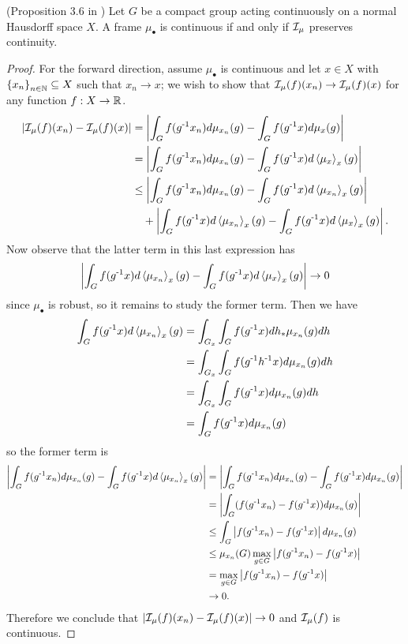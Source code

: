 \begin{theorem}\label{thm:frame-cont-iff-preserves-cont}
    (Proposition 3.6 in \cite{dym2024equivariant})
    Let $G$ be a compact group acting continuously on a normal Hausdorff space $X$.
    A frame $\mu_\bullet$ is continuous if and only if $\mathcal{I}_\mu$ preserves continuity.
    \begin{proof}
        For the forward direction, assume $\mu_\bullet$ is continuous and let $x \in X$ with $\left\{ x_n \right\}_{n \in \mathbb{N}} \subseteq X$ such that $x_n \to x$; we wish to show that $\mathcal{I}_\mu (f) (x_n) \to \mathcal{I}_\mu (f) (x)$ for any function $f : X \to \mathbb{R}$.
        \begin{align*}
            \left| \mathcal{I}_\mu (f) (x_n) - \mathcal{I}_\mu (f) (x) \right|
            &= \left| \int_G f(g^{\text{-}1} x_n) d\mu_{x_n} (g) - \int_G f(g^{\text{-}1} x) d\mu_{x} (g) \right| \\
            &= \left| \int_G f(g^{\text{-}1} x_n) d\mu_{x_n} (g) - \int_G f(g^{\text{-}1} x) d\left\langle \mu_{x} \right\rangle_x (g) \right| \\
            &\leq \left| \int_G f(g^{\text{-}1} x_n) d\mu_{x_n} (g) - \int_G f(g^{\text{-}1} x) d\left\langle \mu_{x_n} \right\rangle_x (g) \right| \\
            &\quad + \left| \int_G f(g^{\text{-}1} x) d\left\langle \mu_{x_n} \right\rangle_x (g) - \int_G f(g^{\text{-}1} x) d\left\langle \mu_{x} \right\rangle_x (g) \right|.
        \end{align*}
        Now observe that the latter term in this last expression has
        \[
            \left| \int_G f(g^{\text{-}1} x) d\left\langle \mu_{x_n} \right\rangle_x (g) - \int_G f(g^{\text{-}1} x) d\left\langle \mu_{x} \right\rangle_x (g) \right| \to 0
        \]
        since $\mu_\bullet$ is robust, so it remains to study the former term.
        Then we have
        \begin{align*}
            \int_G f(g^{\text{-}1} x) d\left\langle \mu_{x_n} \right\rangle_x (g)
            &= \int_{G_x} \int_G f(g^{\text{-}1} x) d h_* \mu_{x_n} (g) dh \\
            &= \int_{G_x} \int_G f(g^{\text{-}1} h^{\text{-}1} x) d \mu_{x_n} (g) dh \\
            &= \int_{G_x} \int_G f(g^{\text{-}1} x) d\mu_{x_n} (g) dh \\
            &= \int_G f(g^{\text{-}1} x) d\mu_{x_n} (g)
        \end{align*}
        so the former term is
        \begin{align*}
            \left| \int_G f(g^{\text{-}1} x_n) d\mu_{x_n} (g) - \int_G f(g^{\text{-}1} x) d\left\langle \mu_{x_n} \right\rangle_x (g) \right|
            &= \left| \int_G f(g^{\text{-}1} x_n) d\mu_{x_n} (g) - \int_G f(g^{\text{-}1} x) d\mu_{x_n} (g) \right| \\
            &= \left| \int_G (f(g^{\text{-}1} x_n)  - f(g^{\text{-}1} x)) d\mu_{x_n} (g) \right| \\
            &\leq \int_G \left| f(g^{\text{-}1} x_n)  - f(g^{\text{-}1} x) \right| d\mu_{x_n} (g) \\
            &\leq \mu_{x_n}(G) \max_{g \in G} \left| f(g^{\text{-}1} x_n) - f(g^{\text{-}1} x) \right| \\
            &= \max_{g \in G} \left| f(g^{\text{-}1} x_n) - f(g^{\text{-}1} x) \right| \\
            &\to 0.
        \end{align*}
        Therefore we conclude that $\left| \mathcal{I}_\mu (f) (x_n) - \mathcal{I}_\mu (f) (x) \right| \to 0$ and $\mathcal{I}_\mu (f)$ is continuous.
        

\end{proof}
\end{theorem}
